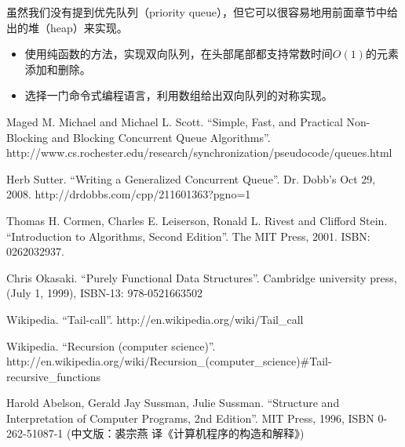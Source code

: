 \documentclass[UTF8]{article}
\begin{document}
虽然我们没有提到优先队列（priority queue），但它可以很容易地用前面章节中给出的堆（heap）来实现。

\begin{Exercise}
\begin{itemize}
\item 使用纯函数的方法，实现双向队列，在头部尾部都支持常数时间$O(1)$的元素添加和删除。
\item 选择一门命令式编程语言，利用数组给出双向队列的对称实现。
\end{itemize}
\end{Exercise}


\ifx\wholebook\relax \else

\begin{thebibliography}{99}

Maged M. Michael and Michael L. Scott. ``Simple, Fast, and Practical Non-Blocking and Blocking Concurrent Queue Algorithms''. http://www.cs.rochester.edu/research/synchronization/pseudocode/queues.html

Herb Sutter. ``Writing a Generalized Concurrent Queue''. Dr. Dobb's Oct 29, 2008. http://drdobbs.com/cpp/211601363?pgno=1

Thomas H. Cormen, Charles E. Leiserson, Ronald L. Rivest and Clifford Stein. ``Introduction to Algorithms, Second Edition''. The MIT Press, 2001. ISBN: 0262032937.

Chris Okasaki. ``Purely Functional Data Structures''. Cambridge university press, (July 1, 1999), ISBN-13: 978-0521663502

Wikipedia. ``Tail-call''. http://en.wikipedia.org/wiki/Tail\_call

Wikipedia. ``Recursion (computer science)''. http://en.wikipedia.org/wiki/Recursion\_(computer\_science)\#Tail-recursive\_functions

Harold Abelson, Gerald Jay Sussman, Julie Sussman. ``Structure and Interpretation of Computer Programs, 2nd Edition''. MIT Press, 1996, ISBN 0-262-51087-1 (中文版：裘宗燕 译《计算机程序的构造和解释》)

\end{thebibliography}
\end{document}
